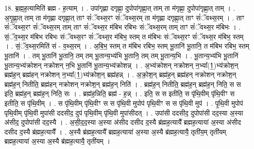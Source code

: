 \documentclass[17pt]{extarticle}
\begin{document}
18. ब्र॒ह्म॒ह॒त्यामिति॑ ब्रह्म - ह॒त्याम् । . उपा॑गृह्णा दगृह्णा॒ दुपोपा॑गृह्णा॒त् ताम् ता म॑गृह्णा॒ दुपोपा॑गृह्णा॒त् ताम् । . अ॒गृ॒ह्णा॒त् ताम् ता म॑गृह्णा दगृह्णा॒त् ताꣳ सं॑ॅवथ्स॒रꣳ सं॑ॅवथ्स॒रम् ता म॑गृह्णा दगृह्णा॒त् ताꣳ सं॑ॅवथ्स॒रम् । . ताꣳ सं॑ॅवथ्स॒रꣳ सं॑ॅवथ्स॒रम् ताम् ताꣳ सं॑ॅवथ्स॒र म॑बिभ रबिभः संॅवथ्स॒रम् ताम् ताꣳ सं॑ॅवथ्स॒र म॑बिभः । . सं॒ॅव॒थ्स॒र म॑बिभ रबिभः संॅवथ्स॒रꣳ सं॑ॅवथ्स॒र म॑बिभ॒ स्तम् त म॑बिभः संॅवथ्स॒रꣳ सं॑ॅवथ्स॒र म॑बिभ॒ स्तम् । . सं॒ॅव॒थ्स॒रमिति॑ सं - व॒थ्स॒रम् । . अ॒बि॒भ॒ स्तम् त म॑बिभ रबिभ॒ स्तम् भू॒तानि॑ भू॒तानि॒ त म॑बिभ रबिभ॒ स्तम् भू॒तानि॑ । . तम् भू॒तानि॑ भू॒तानि॒ तम् तम् भू॒तान्य॒भ्य॑भि भू॒तानि॒ तम् तम् भू॒तान्य॒भि । . भू॒तान्य॒भ्य॑भि भू॒तानि॑ भू॒तान्य॒भ्य॑क्रोशन् नक्रोशन् न॒भि भू॒तानि॑ भू॒तान्य॒भ्य॑क्रोशन्न् । . अ॒भ्य॑क्रोशन् नक्रोशन् न॒भ्या᳚(1॒)भ्य॑क्रोश॒न् ब्रह्म॑ह॒न् ब्रह्म॑हन् नक्रोशन् न॒भ्या᳚(1॒)भ्य॑क्रोश॒न् ब्रह्म॑हन्न् । . अ॒क्रो॒श॒न् ब्रह्म॑ह॒न् ब्रह्म॑हन् नक्रोशन् नक्रोश॒न् ब्रह्म॑ह॒न् नितीति॒ ब्रह्म॑हन् नक्रोशन् नक्रोश॒न् ब्रह्म॑ह॒न् निति॑ । . ब्रह्म॑ह॒न् नितीति॒ ब्रह्म॑ह॒न् ब्रह्म॑ह॒न् निति॒ स स इति॒ ब्रह्म॑ह॒न् ब्रह्म॑ह॒न् निति॒ सः । . ब्रह्म॑ह॒न्निति॒ ब्रह्म॑ - ह॒न्न् । . इति॒ स स इतीति॒ स पृ॑थि॒वीम् पृ॑थि॒वीꣳ स इतीति॒ स पृ॑थि॒वीम् । . स पृ॑थि॒वीम् पृ॑थि॒वीꣳ स स पृ॑थि॒वी मुपोप॑ पृथि॒वीꣳ स स पृ॑थि॒वी मुप॑ । . पृ॒थि॒वी मुपोप॑ पृथि॒वीम् पृ॑थि॒वी मुपा॑सी ददसीद॒ दुप॑ पृथि॒वीम् पृ॑थि॒वी मुपा॑सीदत् । . उपा॑सी ददसीद॒ दुपोपा॑सी दद॒स्या अ॒स्या अ॑सीद॒ दुपोपा॑सी दद॒स्यै । . अ॒सी॒द॒द॒स्या अ॒स्या अ॑सीद दसीद द॒स्यै ब्र॑ह्मह॒त्यायै᳚ ब्रह्मह॒त्याया॑ अ॒स्या अ॑सीद दसीद द॒स्यै ब्र॑ह्मह॒त्यायै᳚ । . अ॒स्यै ब्र॑ह्मह॒त्यायै᳚ ब्रह्मह॒त्याया॑ अ॒स्या अ॒स्यै ब्र॑ह्मह॒त्यायै॒ तृती॑य॒म् तृती॑यम् ब्रह्मह॒त्याया॑ अ॒स्या अ॒स्यै ब्र॑ह्मह॒त्यायै॒ तृती॑यम् । \newline
\end{document}
